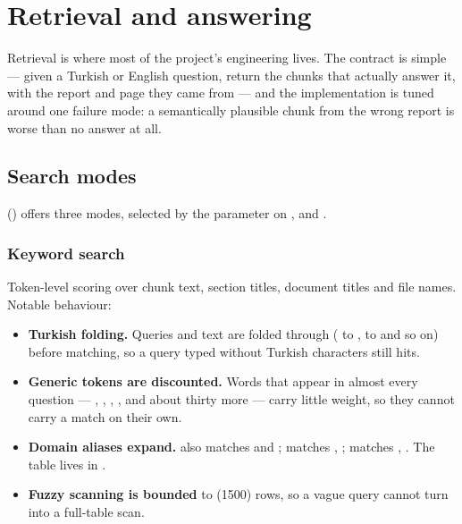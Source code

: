 \chapter{Retrieval and answering}
\label{ch:retrieval}

Retrieval is where most of the project's engineering lives. The contract is
simple --- given a Turkish or English question, return the chunks that actually
answer it, with the report and page they came from --- and the implementation is
tuned around one failure mode: a semantically plausible chunk from the wrong
report is worse than no answer at all.

\section{Search modes}

 () offers three
modes, selected by the  parameter on ,
 and .

\subsection{Keyword search}

Token-level scoring over chunk text, section titles, document titles and file
names. Notable behaviour:

\begin{itemize}
\item \textbf{Turkish folding.} Queries and text are folded through
 ( to ,  to  and so
on) before matching, so a query typed without Turkish characters still hits.
\item \textbf{Generic tokens are discounted.} Words that appear in almost every
question --- , , , ,
 and about thirty more --- carry little weight, so they cannot carry
a match on their own.
\item \textbf{Domain aliases expand.}  also matches 
and ;  matches , ;
 matches , . The table lives in
.
\item \textbf{Fuzzy scanning is bounded} to 
(1500) rows, so a vague query cannot turn into a full-table scan.
\end{itemize}

